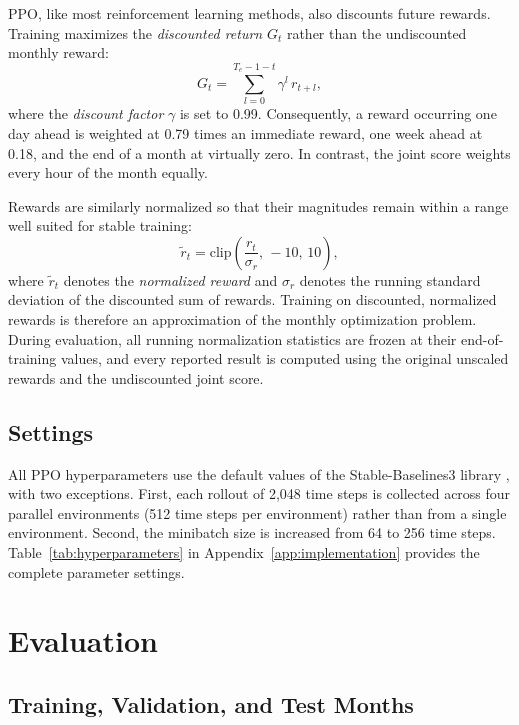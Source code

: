\documentclass{UNCC-thesis}
\begin{document}
PPO, like most reinforcement learning methods, also discounts future rewards. Training
maximizes the \emph{discounted return} \(G_t\) rather than the undiscounted monthly reward:
\begin{equation}
  G_t=\sum_{l=0}^{T_e-1-t}\gamma^{l}\,r_{t+l},
  \label{eq:discounted-return}
\end{equation}
where the \emph{discount factor} \(\gamma\) is set to 0.99. Consequently, a reward occurring
one day ahead is weighted at 0.79 times an immediate reward, one week ahead at 0.18, and the
end of a month at virtually zero. In contrast, the joint score weights every hour of the month
equally.

Rewards are similarly normalized so that their magnitudes remain within a range well suited
for stable training:
\begin{equation}
  \widetilde r_t=\mathrm{clip}\!\left(\frac{r_t}{\sigma_r},\,-10,\,10\right),
  \label{eq:reward-normalization}
\end{equation}
where \(\widetilde r_t\) denotes the \emph{normalized reward} and \(\sigma_r\) denotes the running
standard deviation of the discounted sum of rewards. Training on discounted, normalized
rewards is therefore an approximation of the monthly optimization problem. During evaluation,
all running normalization statistics are frozen at their end-of-training values, and every
reported result is computed using the original unscaled rewards and the undiscounted joint
score.

\subsection{Settings}
\label{sec:method-training}

All PPO hyperparameters use the default values of the Stable-Baselines3 library
\cite{sb3ppodocs}, with two exceptions. First, each rollout of 2,048 time steps is collected
across four parallel environments (512 time steps per environment) rather than from a single
environment. Second, the minibatch size is increased from 64 to 256 time steps.
Table~\ref{tab:hyperparameters} in Appendix~\ref{app:implementation} provides the complete
parameter settings.

\section{Evaluation}
\label{sec:method-evaluation}

\subsection{Training, Validation, and Test Months}
\label{sec:method-cv}
\end{document}
